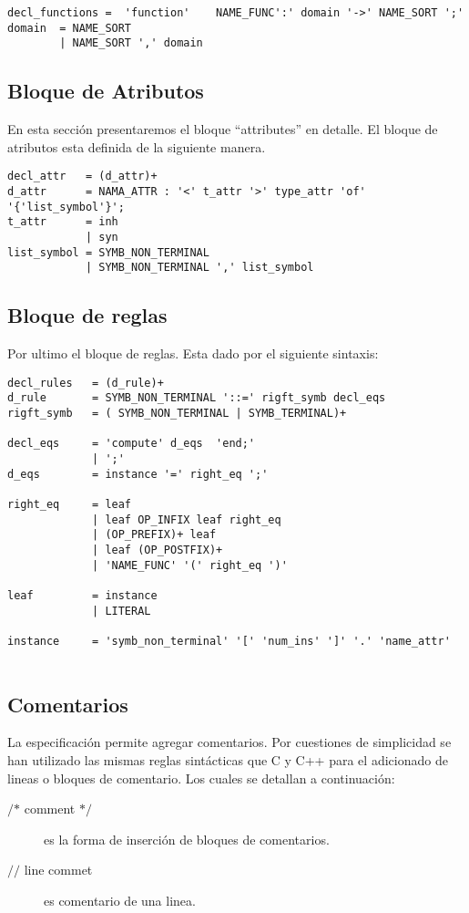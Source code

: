 \begin{center}
\lstset{language=inform}
\tiny
\begin{lstlisting}[frame=single]
decl_functions =  'function'	NAME_FUNC':' domain '->' NAME_SORT ';'
domain  = NAME_SORT
        | NAME_SORT ',' domain
\end{lstlisting}
\end{center}
\subsection{Bloque de Atributos}
En esta sección presentaremos el bloque ``attributes'' en detalle. El bloque de atributos esta definida de la siguiente manera.
\begin{center}
\lstset{language=inform}
\tiny
\begin{lstlisting}[frame=single]
decl_attr   = (d_attr)+ 
d_attr      = NAMA_ATTR : '<' t_attr '>' type_attr 'of' '{'list_symbol'}';
t_attr      = inh
            | syn
list_symbol = SYMB_NON_TERMINAL 
            | SYMB_NON_TERMINAL ',' list_symbol
\end{lstlisting}
\end{center}

\subsection{Bloque de reglas}
Por ultimo el bloque de reglas. Esta dado por el siguiente sintaxis:
\begin{center}
\lstset{language=inform}
\tiny
\begin{lstlisting}[frame=single]
decl_rules   = (d_rule)+ 
d_rule       = SYMB_NON_TERMINAL '::=' rigft_symb decl_eqs
rigft_symb   = ( SYMB_NON_TERMINAL | SYMB_TERMINAL)+

decl_eqs     = 'compute' d_eqs  'end;'
             | ';'
d_eqs        = instance '=' right_eq ';'

right_eq     = leaf
             | leaf OP_INFIX leaf right_eq
             | (OP_PREFIX)+ leaf
             | leaf (OP_POSTFIX)+
             | 'NAME_FUNC' '(' right_eq ')' 

leaf         = instance
             | LITERAL

instance     = 'symb_non_terminal' '[' 'num_ins' ']' '.' 'name_attr'
            
\end{lstlisting}
\end{center}
\subsection{Comentarios}
La especificación permite agregar comentarios. Por cuestiones de simplicidad se han utilizado las mismas reglas sintácticas que C y C++ para el adicionado de lineas o bloques de comentario. Los cuales se detallan a continuación:
\begin{description}
 \item [$\textbf{/*}$ comment $\textbf{*/}$] es la forma de inserción de bloques de comentarios.
 \item [$\textbf{//}$ line commet] es comentario de una linea.
\end{description} 

